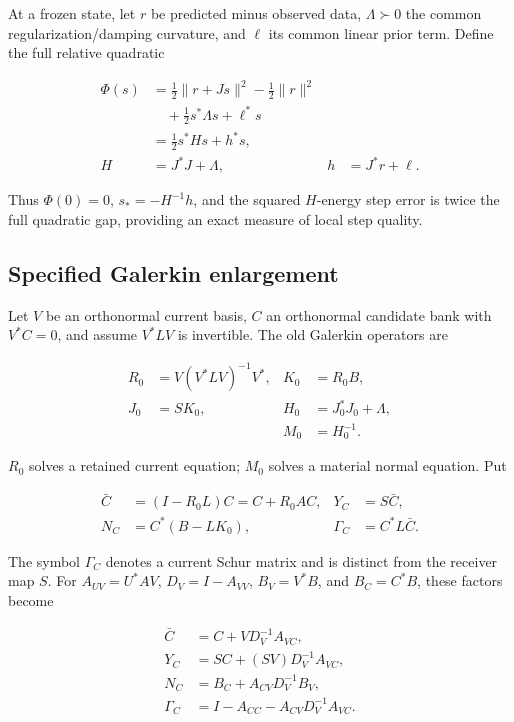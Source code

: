 At a frozen state, let \(r\) be predicted minus observed data, \(\Lambda\succ0\) the common regularization/damping curvature, and \(\ell\) its common linear prior term. Define the full relative quadratic

\[
\begin{aligned}
\Phi(s)&=\frac12\|r+Js\|^2-\frac12\|r\|^2\\
&\quad+\frac12s^*\Lambda s+\ell^*s\\
&=\frac12s^*Hs+h^*s,\\
H&=J^*J+\Lambda,& h&=J^*r+\ell.
\end{aligned}\tag{3}
\]

Thus \(\Phi(0)=0\), \(s_*=-H^{-1}h\), and the squared \(H\)-energy step error is twice the full quadratic gap, providing an exact measure of local step quality.

\subsection{Specified Galerkin enlargement}

Let \(V\) be an orthonormal current basis, \(C\) an orthonormal candidate bank with \(V^*C=0\), and assume \(V^*LV\) is invertible. The old Galerkin operators are

\[
\begin{aligned}
R_0&=V(V^*LV)^{-1}V^*,& K_0&=R_0B,\\
J_0&=SK_0,& H_0&=J_0^*J_0+\Lambda,\\
&&M_0&=H_0^{-1}.
\end{aligned}\tag{4}
\]

\(R_0\) solves a retained current equation; \(M_0\) solves a material normal equation. Put

\[
\begin{aligned}
\bar C&=(I-R_0L)C=C+R_0AC,& Y_C&=S\bar C,\\
N_C&=C^*(B-LK_0),& \Gamma_C&=C^*L\bar C.
\end{aligned}\tag{5}
\]

The symbol \(\Gamma_C\) denotes a current Schur matrix and is distinct from the receiver map \(S\). For \(A_{UV}=U^*AV\), \(D_V=I-A_{VV}\), \(B_V=V^*B\), and \(B_C=C^*B\), these factors become

\[
\begin{aligned}
\bar C&=C+VD_V^{-1}A_{VC},\\
Y_C&=SC+(SV)D_V^{-1}A_{VC},\\
N_C&=B_C+A_{CV}D_V^{-1}B_V,\\
\Gamma_C&=I-A_{CC}-A_{CV}D_V^{-1}A_{VC}.
\end{aligned} \tag{6}
\]

